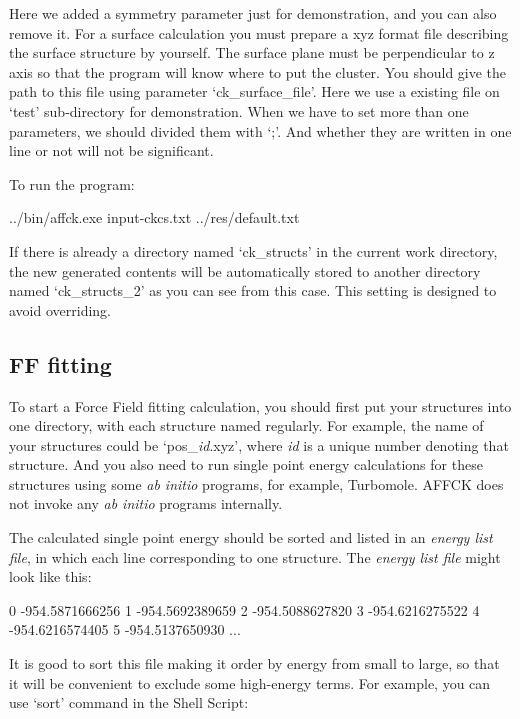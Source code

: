 \documentclass[11pt]{book}
\begin{document}
Here we added a symmetry parameter just for demonstration, and you can also remove it. 
For a surface calculation you must prepare a xyz format file describing the surface structure by yourself. 
The surface plane must be perpendicular to z axis so that the program will know where to put the cluster.
You should give the path to this file using parameter `ck\_surface\_file'. 
Here we use a existing file on `test' sub-directory for demonstration.
When we have to set more than one parameters, we should divided them with `;'. And whether they are written in 
one line or not will not be significant.

To run the program:

\begin{everbatim}
../bin/affck.exe input-ckcs.txt ../res/default.txt
\end{everbatim}

If there is already a directory named `ck\_structs' in the current work directory, the new generated contents
will be automatically stored to another directory named `ck\_structs\_2' as you can see from this case. 
This setting is designed to avoid overriding.

\subsection{FF fitting}

To start a Force Field fitting calculation, you should first put your structures into one directory, 
with each structure named regularly. For example, the name of your structures could be `pos\_\emph{id}.xyz', 
where \emph{id} is a unique number denoting that structure. And you also need to run single point energy calculations 
for these structures using some \emph{ab initio} programs, for example, Turbomole. AFFCK does not invoke any \emph{ab initio} 
programs internally.

The calculated single point energy should be sorted and listed in an \emph{energy list file}, in which each line corresponding to 
one structure. The \emph{energy list file} might look like this:

\begin{everbatim}
0   -954.5871666256
1   -954.5692389659
2   -954.5088627820
3   -954.6216275522
4   -954.6216574405
5   -954.5137650930
...
\end{everbatim}

It is good to sort this file making it order by energy from small to large, so that it will be convenient to exclude some high-energy terms. 
For example, you can use `sort' command in the Shell Script:
\end{document}
